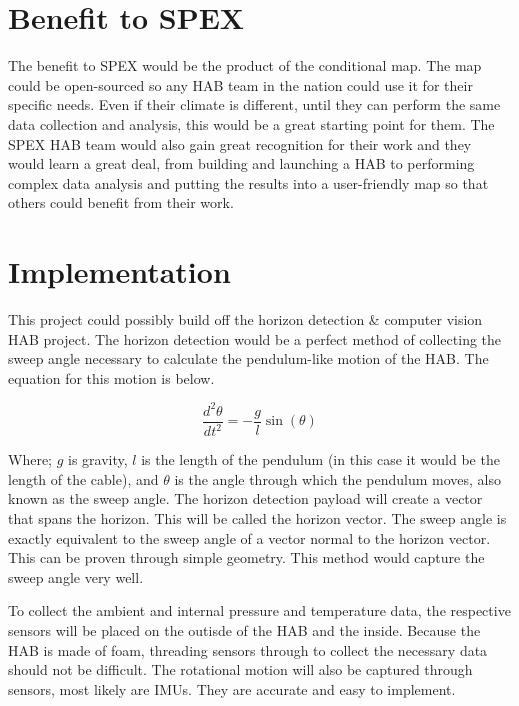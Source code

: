 \documentclass[conference]{IEEEtran} %
\begin{document}
\section{Benefit to SPEX}\label{sec:benefit}
The benefit to SPEX would be the product of the conditional map. The map could be open-sourced so any HAB team in the nation could use it for their specific needs. Even if their climate is
different, until they can perform the same data collection and analysis, this would be a great starting point for them. The SPEX HAB team would also gain great recognition for their work
and they would learn a great deal, from building and launching a HAB to performing complex data analysis and putting the results into a user-friendly map so that others could benefit from their
work.

\section{Implementation}\label{sec:implementation}
This project could possibly build off the horizon detection \& computer vision HAB project. The horizon detection would be a perfect method of collecting the sweep angle necessary to
calculate the pendulum-like motion of the HAB\@. The equation for this motion is below.

\begin{equation} \label{pendulum}
  \frac{d^2\theta}{dt^2} = -\frac{g}{l}\sin(\theta)
\end{equation}

Where; \(g\) is gravity, \(l\) is the length of the pendulum (in this case it would be the length of the cable), and \(\theta \) is the angle through which the pendulum moves, also known
as the sweep angle. The horizon detection payload will create a vector that spans the horizon. This will be called the horizon vector. The sweep angle is exactly equivalent to
the sweep angle of a vector normal to the horizon vector. This can be proven through simple geometry. This method would capture the sweep angle very well.

To collect the ambient and internal pressure and temperature data, the respective sensors will be placed on the outisde of the HAB and the inside. Because the HAB is made of
foam, threading sensors through to collect the necessary data should not be difficult. The rotational motion will also be captured through sensors, most likely are IMUs. They
are accurate and easy to implement.
\end{document}
